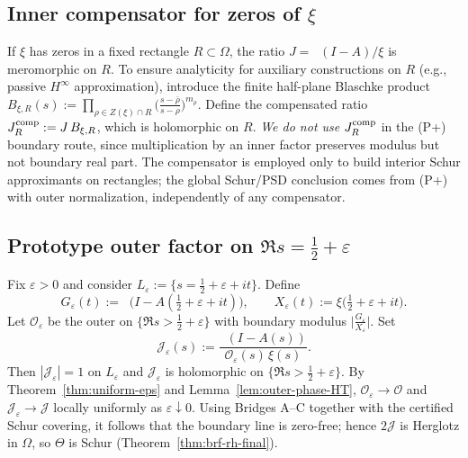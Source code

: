 \documentclass[11pt]{article}
\theoremstyle{definition}
\theoremstyle{remark}
\DeclareMathOperator{\dettwo}{det_2}
\begin{document}
\subsection{Inner compensator for zeros of \(\xi\)}\label{subsec:bl-compensator}
If \(\xi\) has zeros in a fixed rectangle \(R\subset\Omega\), the ratio \(J=\dettwo(I-A)/\xi\) is meromorphic on \(R\).
To ensure analyticity for auxiliary constructions on \(R\) (e.g., passive \(H^\infty\) approximation), introduce the finite half-plane Blaschke product
\(
 B_{\xi,R}(s):=\prod_{\rho\in Z(\xi)\cap R} \big(\tfrac{s-\overline \rho}{s-\rho}\big)^{m_\rho}.
\)
Define the compensated ratio \(J_R^{\rm comp}:=J\,B_{\xi,R}\), which is holomorphic on \(R\).
\emph{We do not use} \(J_R^{\rm comp}\) in the (P+) boundary route, since multiplication by an inner factor preserves modulus but not boundary real part. The compensator is employed only to build interior Schur approximants on rectangles; the global Schur/PSD conclusion comes from (P+) with outer normalization, independently of any compensator.

\subsection{Prototype outer factor on \(\Re s=\tfrac12+\varepsilon\)}\label{subsec:outer-prototype}
Fix \(\varepsilon>0\) and consider \(L_{\varepsilon}:=\{s=\tfrac12+\varepsilon+it\}\). Define
\[
 G_{\varepsilon}(t):=\dettwo\big(I-A(\tfrac12+\varepsilon+it)\big),\qquad X_{\varepsilon}(t):=\xi\big(\tfrac12+\varepsilon+it\big).
\]
Let \(\mathcal O_{\varepsilon}\) be the outer on \(\{\Re s>\tfrac12+\varepsilon\}\) with boundary modulus \(\big|\frac{G_{\varepsilon}}{X_{\varepsilon}}\big|\). Set
\[
 \mathcal J_{\varepsilon}(s):=\frac{\dettwo(I-A(s))}{\mathcal O_{\varepsilon}(s)\,\xi(s)}.
\]
Then \(|\mathcal J_{\varepsilon}|=1\) on \(L_{\varepsilon}\) and \(\mathcal J_{\varepsilon}\) is holomorphic on \(\{\Re s>\tfrac12+\varepsilon\}\). By Theorem~\ref{thm:uniform-eps} and Lemma~\ref{lem:outer-phase-HT}, \(\mathcal O_{\varepsilon}\to\mathcal O\) and \(\mathcal J_{\varepsilon}\to\mathcal J\) locally uniformly as \(\varepsilon\downarrow 0\). Using Bridges A--C together with the certified Schur covering, it follows that the boundary line is zero-free; hence \(2\mathcal J\) is Herglotz in \(\Omega\), so \(\Theta\) is Schur (Theorem~\ref{thm:brf-rh-final}).
\end{document}
